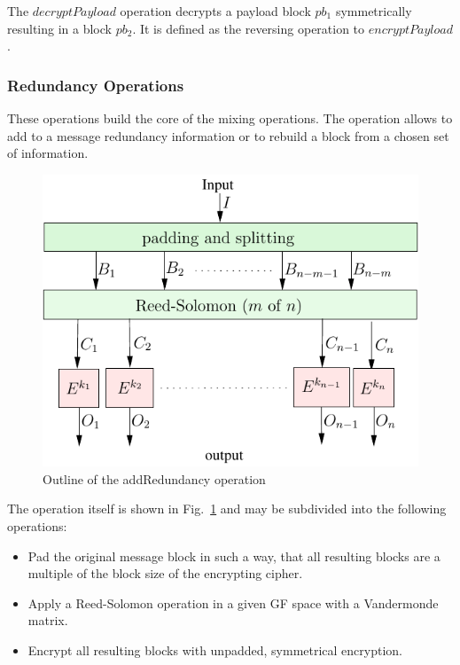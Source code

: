 \documentclass[10pt,journal,compsoc,twocolumn,twoside]{IEEEtran}
\let\MYoriglatexcaption\caption
\renewcommand{\caption}[2][\relax]{\MYoriglatexcaption[#2]{#2}}
\begin{document}
The $decryptPayload$ operation decrypts a payload block $pb_1$ symmetrically resulting in a block $pb_2$. It is defined as the reversing operation to $encryptPayload$. 

%
%

\subsubsection{Redundancy Operations}
These operations build the core of the mixing operations. The operation allows to add to a message redundancy information or to rebuild a block from a chosen set of information. 

\begin{figure}[ht]\centering
	\includegraphics[width=0.6\columnwidth]{addRedundancyOp}
	\caption{Outline of the addRedundancy operation}
	\label{fig:addRedundancyOperation}
\end{figure}

The operation itself is shown in Fig.~\ref{fig:addRedundancyOperation} and may be subdivided into the following operations:
\begin{itemize}
	\item Pad the original message block in such a way, that all resulting blocks are a multiple of the block size of the encrypting cipher.
	\item Apply a Reed-Solomon operation in a given GF space with a Vandermonde matrix.
	\item Encrypt all resulting blocks with unpadded, symmetrical encryption.
\end{itemize}
\end{document}

